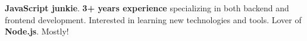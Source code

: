 

\begin{cvparagraph}

\textbf{JavaScript junkie}. \textbf{3+ years experience} specializing in both backend and frontend development. Interested in learning new technologies and tools. Lover of \textbf{Node.js}. Mostly!
\end{cvparagraph}
